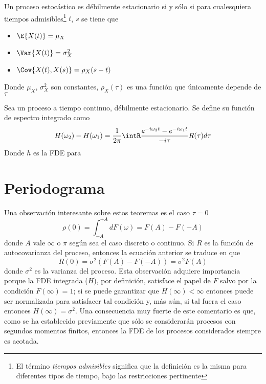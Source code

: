 \begin{definicion}
Un proceso estocástico \xt es débilmente estacionario si y sólo si para cualesquiera tiempos 
admisibles\footnote{El término \textit{tiempos admisibles} significa que la definición es la misma
para diferentes tipos de tiempo, bajo las restricciones pertinente} $t$, $s$ se tiene que
\begin{itemize}
\item $\E{X(t)} = \mu_X$
\item $\Var{X(t)} = \sigma^{2}_X$
\item $\Cov{X(t),X(s)} = \rho_X (s-t)$
\end{itemize}
Donde $\mu_X$, $\sigma^{2}_X$ son constantes, $\rho_X(\tau)$ es una función que únicamente 
depende de $\tau$
\label{est_orden_primera}
\end{definicion}

\begin{definicion}
Sea \xt un proceso a tiempo continuo, débilmente estacionario. Se define su
función de espectro integrado como
\begin{equation*}
H(\omega_2) - H(\omega_1) = 
\frac{1}{2 \pi} \intR \frac{e^{- i \omega_2 t}-e^{- i \omega_1 t}}{- i \tau} R(\tau) d\tau
\end{equation*}
Donde $h$ es la FDE para \xt
\end{definicion}

\section{Periodograma}

Una observación interesante sobre estos teoremas es el caso $\tau = 0$
\begin{equation*}
\rho(0) = \int_{-A}^{+A} dF(\omega) = F(A) - F(-A)
\end{equation*}
donde $A$ vale $\infty$ o $\pi$ según sea el caso discreto o continuo. Si $R$ es la función de
autocovarianza del proceso, entonces la ecuación anterior se traduce en que
\begin{equation*}
R(0) = \sigma^{2} \left( F(A) - F(-A) \right) = \sigma^{2} F(A)
\end{equation*}
donde $\sigma^{2}$ es la varianza del proceso. 
Esta observación adquiere importancia porque la FDE integrada ($H$), por definición, satisface 
el papel de $F$ salvo por la condición $F(\infty)=1$; si se puede garantizar que 
$H(\infty)<\infty$ entonces puede ser normalizada para satisfacer tal condición y, más aún,
si tal fuera el caso entonces $H(\infty)=\sigma^{2}$. Una consecuencia muy fuerte de este 
comentario es que, como se ha establecido previamente que sólo se considerarán procesos con
segundos momentos finitos, entonces la FDE de los procesos considerados siempre es acotada.


